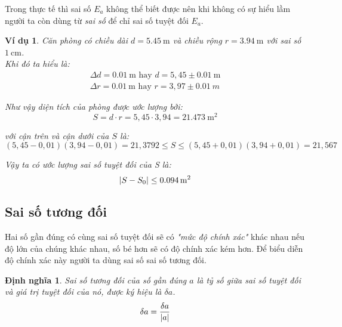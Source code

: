 \documentclass{book}    %
\DeclarePairedDelimiter\abs{\lvert}{\rvert}%
\newtheorem{definition}{Định nghĩa}
\newtheorem{exmp}{Ví dụ}[chapter]
\begin{document}
Trong thực tế thì sai số \(E_a\) không thể biết được nên khi không có sự hiểu
lầm người ta còn dùng từ \emph{sai số} để chỉ sai số tuyệt đối \(E_a\).

\begin{exmp} \label{exmp:room_example}
    Căn phòng có chiều dài \(d = \SI{5,45}{\m}\) và chiều rộng \(r =
    \SI{3,94}{\m}\) với sai số \(\SI{1}{\cm}\).\\

    Khi đó ta hiểu là:
    \begin{gather*}
        \Delta d = \SI{0,01}{\m} \textrm{ hay } d = 5,45 \pm \SI{0,01}{\m}\\
        \Delta r = \SI{0,01}{\m} \textrm{ hay } r = 3,97 \pm \SI{0.01}{m}
    \end{gather*}

    Như vậy diện tích của phòng được ước lượng bởi:
    \begin{equation*}
        S = d \cdot r = 5,45 \cdot 3,94 = \SI{21,473}{\meter\squared}
    \end{equation*}

    với cận trên và cận dưới của \(S\) là:
    \begin{equation*}
        (5,45 - 0,01)(3,94 - 0,01) = 21,3792 \leq S \leq (5,45 + 0,01)(3,94 + 0,01) = 21,567
    \end{equation*}

    Vậy ta có ước lượng sai số tuyệt đối của S là:
    \begin{equation*}
        \abs{S - S_0} \leq \SI{0,094}{\meter\squared}
    \end{equation*}
\end{exmp}

\subsection{Sai số tương đối}

Hai số gần đúng có cùng sai số tuyệt đối sẽ có \emph{"mức độ chính xác"} khác
nhau nếu độ lớn của chúng khác nhau, số bé hơn sẽ có độ chính xác kém hơn. Để
biểu diễn độ chính xác này người ta dùng sai số sai số tương đối.

\begin{definition}
    \emph{Sai số tương đối} của số gần đúng \(a\) là tỷ số giữa sai số tuyệt đối
    và giá trị tuyệt đối của nó, được ký hiệu là \(\delta a\).
    \begin{equation} \label{eq:4}
        \delta a = \frac{\delta a}{\abs{a}}
    \end{equation}
\end{definition}
\end{document}
